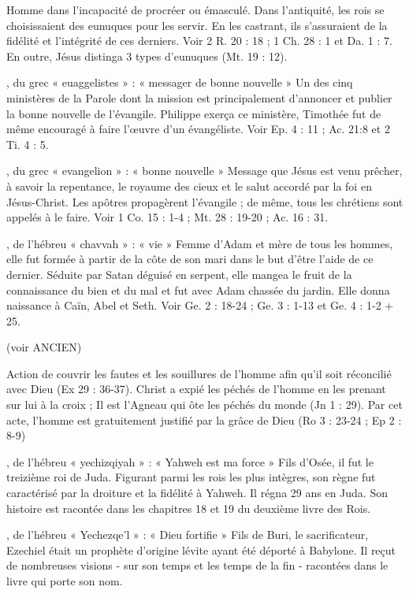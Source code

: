 \begin{multicols}{2}
Homme dans l'incapacité de procréer ou émasculé. Dans l'antiquité, les rois se choisissaient des eunuques pour les servir. En les castrant, ils s’assuraient de la fidélité et l’intégrité de ces derniers. Voir 2 R. 20 : 18 ; 1 Ch. 28 : 1 et Da. 1 : 7. En outre, Jésus distinga 3 types d'eunuques (Mt. 19 : 12).


, du grec « euaggelistes » : « messager de bonne nouvelle »
Un des cinq ministères de la Parole dont la mission est principalement d’annoncer et publier la bonne nouvelle de l’évangile. Philippe exerça ce ministère, Timothée fut de même encouragé à faire l'œuvre d'un évangéliste. Voir Ep. 4 : 11 ; Ac. 21:8 et 2 Ti. 4 : 5.


, du grec « evangelion » : « bonne nouvelle »
Message que Jésus est venu prêcher, à savoir la repentance, le royaume des cieux et le salut accordé par la foi en Jésus-Christ. Les apôtres propagèrent l'évangile ; de même, tous les chrétiens sont appelés à le faire. Voir 1 Co. 15 : 1-4 ; Mt. 28 : 19-20 ; Ac. 16 : 31.


, de l'hébreu « chavvah » : « vie »
Femme d'Adam et mère de tous les hommes, elle fut formée à partir de la côte de son mari dans le but d’être l’aide de ce dernier. Séduite par Satan déguisé en serpent, elle mangea le fruit de la connaissance du bien et du mal et fut avec Adam chassée du jardin. Elle donna naissance à Caïn, Abel et Seth. Voir Ge. 2 : 18-24 ; Ge. 3 : 1-13 et Ge. 4 : 1-2 + 25.


(voir ANCIEN)

Action de couvrir les fautes et les souillures de l'homme afin qu'il soit réconcilié avec Dieu (Ex 29 : 36-37). Christ a expié les péchés de l'homme en les prenant sur lui à la croix ; Il est l'Agneau qui ôte les péchés du monde (Jn 1 : 29). Par cet acte, l'homme est gratuitement justifié par la grâce de Dieu (Ro 3 : 23-24 ; Ep 2 : 8-9)


, de l'hébreu « yechizqiyah » : « Yahweh est ma force »
Fils d'Osée, il fut le treizième roi de Juda. Figurant parmi les rois les plus intègres, son règne fut caractérisé par la droiture et la fidélité à Yahweh. Il régna 29 ans en Juda. Son histoire est racontée dans les chapitres 18 et 19 du deuxième livre des Rois.


, de l'hébreu « Yechezqe'l » : « Dieu fortifie »
Fils de Buri, le sacrificateur, Ezechiel était un prophète d’origine lévite ayant été déporté à Babylone. Il reçut de nombreuses visions - sur son temps et les temps de la fin - racontées dans le livre qui porte son nom.



\end{multicols}
